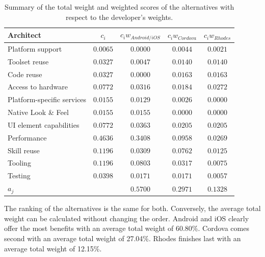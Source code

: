 \begin{table}[h]
    \begin{center}
        \begin{tabular}{lcccc}
            \hline
            \textbf{Architect}         & $c_i$        & $c_i w_{Android/iOS}$ & $c_i w_{Cordova}$  & $c_i w_{Rhodes}$ \\
            \hline
            Platform support           & $0.0065$     & $0.0000$          & $0.0044$       & $0.0021$     \\
            Toolset reuse              & $0.0327$     & $0.0047$          & $0.0140$       & $0.0140$     \\
            Code reuse                 & $0.0327$     & $0.0000$          & $0.0163$       & $0.0163$     \\
            Access to hardware         & $0.0772$     & $0.0316$          & $0.0184$       & $0.0272$     \\
            Platform-specific services & $0.0155$     & $0.0129$          & $0.0026$       & $0.0000$     \\
            Native Look \& Feel        & $0.0155$     & $0.0155$          & $0.0000$       & $0.0000$     \\
            UI element capabilities    & $0.0772$     & $0.0363$          & $0.0205$       & $0.0205$     \\
            Performance                & $0.4636$     & $0.3408$          & $0.0958$       & $0.0269$     \\
            Skill reuse                & $0.1196$     & $0.0309$          & $0.0762$       & $0.0125$     \\
            Tooling                    & $0.1196$     & $0.0803$          & $0.0317$       & $0.0075$     \\
            Testing                    & $0.0398$     & $0.0171$          & $0.0171$       & $0.0057$     \\
            \hline
            $a_j$                      &              & $0.5700$          & $0.2971$       & $0.1328$     \\
            \hline
        \end{tabular}
        \caption{Summary of the total weight and weighted scores of the alternatives with respect to the developer's weights.}
        \label{tab:total:developer}
    \end{center}
\end{table}

The ranking of the alternatives is the same for both. Conversely, the average total weight can be calculated without changing the order. Android and iOS clearly offer the most benefits with an average total weight of 60.80\%. Cordova comes second with an average total weight of 27.04\%. Rhodes finishes last with an average total weight of 12.15\%. 

